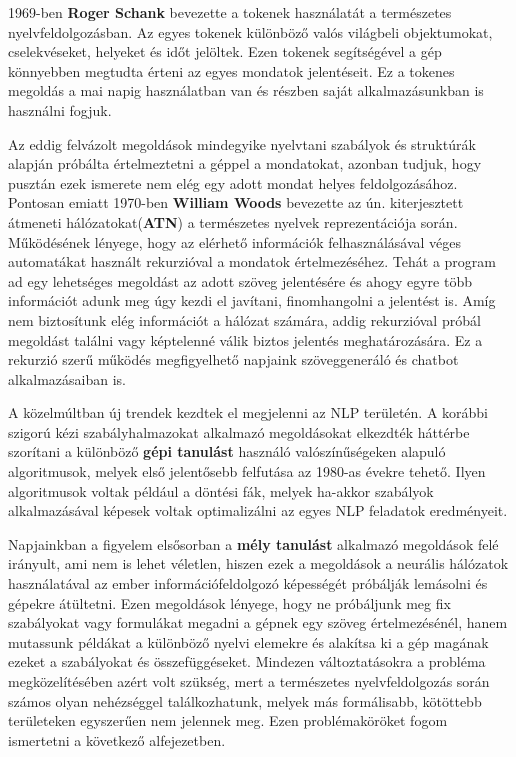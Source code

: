 1969-ben \textbf{Roger Schank} bevezette a tokenek használatát a természetes \\
nyelvfeldolgozásban.\cite{history} Az egyes tokenek különböző valós világbeli objektumokat, cselekvéseket, helyeket és időt jelöltek. Ezen tokenek segítségével a gép könnyebben megtudta érteni az egyes mondatok jelentéseit. Ez a tokenes megoldás a mai napig használatban van és részben saját alkalmazásunkban is használni fogjuk.

Az eddig felvázolt megoldások mindegyike nyelvtani szabályok és struktúrák alapján próbálta értelmeztetni a géppel a mondatokat, azonban tudjuk, hogy pusztán ezek ismerete nem elég egy adott mondat helyes feldolgozásához. Pontosan emiatt 1970-ben \textbf{William Woods} bevezette az ún. kiterjesztett átmeneti hálózatokat(\textbf{ATN}) a természetes nyelvek reprezentációja során.\cite{atn} Működésének lényege, hogy az elérhető információk felhasználásával véges automatákat használt rekurzióval a mondatok értelmezéséhez. Tehát a program ad egy lehetséges megoldást az adott szöveg jelentésére és ahogy egyre több információt adunk meg úgy kezdi el javítani, finomhangolni a jelentést is. Amíg nem biztosítunk elég információt a hálózat számára, addig rekurzióval próbál megoldást találni vagy képtelenné válik biztos jelentés meghatározására. Ez a rekurzió szerű működés megfigyelhető napjaink szöveggeneráló és chatbot alkalmazásaiban is.

A közelmúltban új trendek kezdtek el megjelenni az NLP területén. A korábbi szigorú kézi szabályhalmazokat alkalmazó megoldásokat elkezdték háttérbe szorítani a különböző \textbf{gépi tanulást} használó valószínűségeken alapuló algoritmusok, melyek első jelentősebb felfutása az 1980-as évekre tehető. Ilyen algoritmusok voltak például a döntési fák, melyek ha-akkor szabályok alkalmazásával képesek voltak optimalizálni az egyes NLP feladatok eredményeit.

Napjainkban a figyelem elsősorban a \textbf{mély tanulást} alkalmazó megoldások felé irányult, ami nem is lehet véletlen, hiszen ezek a megoldások a neurális hálózatok használatával az ember információfeldolgozó képességét próbálják lemásolni és gépekre átültetni. Ezen megoldások lényege, hogy ne próbáljunk meg fix szabályokat vagy formulákat megadni a gépnek egy szöveg értelmezésénél, hanem mutassunk példákat a különböző nyelvi elemekre és alakítsa ki a gép magának ezeket a szabályokat és összefüggéseket. Mindezen változtatásokra a probléma megközelítésében azért volt szükség, mert a természetes nyelvfeldolgozás során számos olyan nehézséggel találkozhatunk, melyek más formálisabb, kötöttebb területeken egyszerűen nem jelennek meg. Ezen problémaköröket fogom ismertetni a következő alfejezetben.

